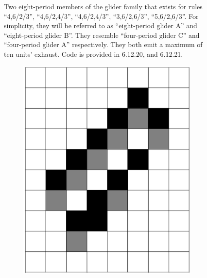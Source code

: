 \documentclass[12pt]{article}
\numberwithin{figure}{section} %
\begin{document}
\begin{figure}[H]
\begin{subfigure}{0.3\textwidth}
     \subcaption{}
   \end{subfigure}
   \setcounter{subfigure}{0}
   \caption{Two eight-period members of the glider family that exists for rules “4,6/2/3”, “4,6/2,4/3”, “4,6/2,4/3”, “3,6/2,6/3”, “5,6/2,6/3”. For simplicity, they will be referred to as “eight-period glider A” and “eight-period glider B”. They resemble “four-period glider C” and “four-period glider A” respectively. They both emit a maximum of ten units’ exhaust.  Code is provided in 6.12.20, and 6.12.21. }
   \label{fig:eight-period gliders}
   \vspace{-1.5em}
\end{figure}

\begin{figure}[H]
\centering
 \begin{subfigure}{0.2\textwidth}
     \centering
     \includegraphics[angle=270,width=\linewidth]{Section4/24.0}
     \subcaption{}
   \end{subfigure}
   \hspace{2cm}
     \begin{subfigure}{0.2\textwidth}

\end{subfigure}
\end{figure}
\end{document}
